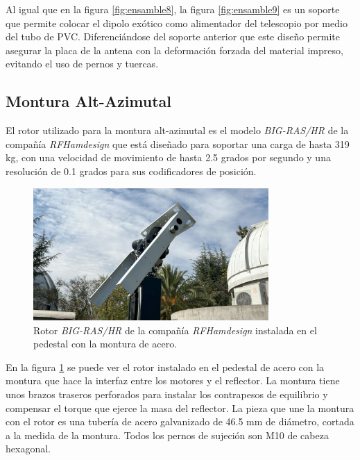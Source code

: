 Al igual que en la figura \ref{fig:ensamble8}, la figura \ref{fig:ensamble9} es un soporte que permite colocar el dipolo exótico como alimentador del telescopio por medio del tubo de PVC. Diferenciándose del soporte anterior que este diseño permite asegurar la placa de la antena con la deformación forzada del material impreso, evitando el uso de pernos y tuercas.\\

\subsection{Montura Alt-Azimutal}

El rotor utilizado para la montura alt-azimutal es el modelo \textit{BIG-RAS/HR} de la compañía \textit{RFHamdesign} que está diseñado para soportar una carga de hasta 319 kg, con una velocidad de movimiento de hasta 2.5 grados por segundo y una resolución de 0.1 grados para sus codificadores de posición.\\

\begin{figure}
    \centering
    \includegraphics[width=0.8\textwidth]{img/soporte_montura}
    \caption{Rotor \textit{BIG-RAS/HR} de la compañía \textit{RFHamdesign} instalada en el pedestal con la montura de acero.}
    \label{fig:ensamble10}
\end{figure}

En la figura \ref{fig:ensamble10} se puede ver el rotor instalado en el pedestal de acero con la montura que hace la interfaz entre los motores y el reflector. La montura tiene unos brazos traseros perforados para instalar los contrapesos de equilibrio y compensar el torque que ejerce la masa del reflector. La pieza que une la montura con el rotor es una tubería de acero galvanizado de 46.5 mm de diámetro, cortada a la medida de la montura. Todos los pernos de sujeción son M10 de cabeza hexagonal.\\

